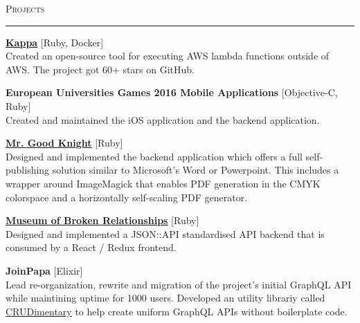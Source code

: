 \documentclass[10pt, a4paper, final, onecolumn, oneside, notitlepage]{article}
\newcommand{\sectionspacing}[0]{ \vspace{10pt} } %
\newcommand{\sectionrule}[0]{ \rule[6pt]{\textwidth}{0.5pt} } %
\renewcommand{\section}[1]{\sectionspacing {\large \scshape #1} \sectionrule}
\begin{document}
\begin{center}
  \section{Projects}
  \begin{flushleft}
    \textbf {\href{https://github.com/monorkin/kappa}{\underline{Kappa}}} [Ruby, Docker]\\
    Created an open-source tool for executing AWS lambda functions outside of AWS. The project got 60+ stars on GitHub.
    \vspace{40mm}

    \textbf{European Universities Games 2016 Mobile Applications} [Objective-C, Ruby]\\
    Created and maintained the iOS application and the backend application. \\
    \vspace{2mm}

    \textbf{\href{https://www.mrgoodknight.de/}{\underline{Mr. Good Knight}}} [Ruby]\\
    Designed and implemented the backend application which offers a full
    self-publishing solution similar to Microsoft's Word or Powerpoint.
    This includes a wrapper around ImageMagick that enables PDF generation in the
    CMYK colorspace and a horizontally self-scaling PDF generator. \\
    \vspace{2mm}

    \textbf{\href{https://brokenships.com}{\underline{Museum of Broken Relationships}}} [Ruby]\\
    Designed and implemented a JSON::API standardised API backend that is
    consumed by a React / Redux frontend. \\
    \vspace{2mm}

    \textbf{JoinPapa} [Elixir]\\
    Lead re-organization, rewrite and migration of the project's initial
    GraphQL API while maintining uptime for 1000 users. Developed an utility
    librariy called \href{https://github.com/monorkin/crudimentary/}{\underline{CRUDimentary}}
    to help create uniform GraphQL APIs without boilerplate code.
    \vspace{2mm}



\end{flushleft}
\end{center}
\end{document}

